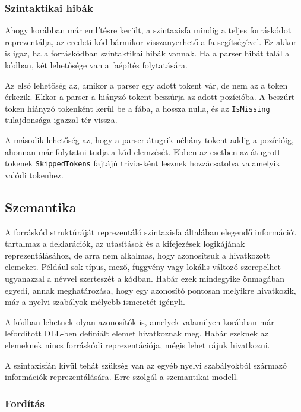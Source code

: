 \documentclass[12pt, a4paper]{report}
\newcommand{\f}[1]{\texttt{#1}}
\begin{document}
\subsubsection{Szintaktikai hibák}

Ahogy korábban már említésre került, a szintaxisfa mindig a teljes forráskódot reprezentálja, az eredeti kód bármikor visszanyerhető a fa segítségével. Ez akkor is igaz, ha a forráskódban szintaktikai hibák vannak. Ha a parser hibát talál a kódban, két lehetősége van a faépítés folytatására.

Az első lehetőség az, amikor a parser egy adott tokent vár, de nem az a token érkezik. Ekkor a parser a hiányzó tokent beszúrja az adott pozícióba. A beszúrt token hiányzó tokenként kerül be a fába, a hossza nulla, és az \f{IsMissing} tulajdonsága igazzal tér vissza.

A második lehetőség az, hogy a parser átugrik néhány tokent addig a pozícióig, ahonnan már folytatni tudja a kód elemzését. Ebben az esetben az átugrott tokenek \f{SkippedTokens} fajtájú trivia-ként lesznek hozzácsatolva valamelyik valódi tokenhez.

\subsection{Szemantika}

A forráskód struktúráját reprezentáló szintaxisfa általában elegendő információt tartalmaz a deklarációk, az utasítások és a kifejezések logikájának reprezentálásához, de arra nem alkalmas, hogy azonosítsuk a hivatkozott elemeket. Például sok típus, mező, függvény vagy lokális változó szerepelhet ugyanazzal a névvel szerteszét a kódban. Habár ezek mindegyike önmagában egyedi, annak meghatározása, hogy egy azonosító pontosan melyikre hivatkozik, már a nyelvi szabályok mélyebb ismeretét igényli.

A kódban lehetnek olyan azonosítók is, amelyek valamilyen korábban már lefordított DLL-ben definiált elemet hivatkoznak meg. Habár ezeknek az elemeknek nincs forráskódi reprezentációja, mégis lehet rájuk hivatkozni.

A szintaxisfán kívül tehát szükség van az egyéb nyelvi szabályokból származó információk reprezentálására. Erre szolgál a szemantikai modell.

\subsubsection{Fordítás}
\end{document}
